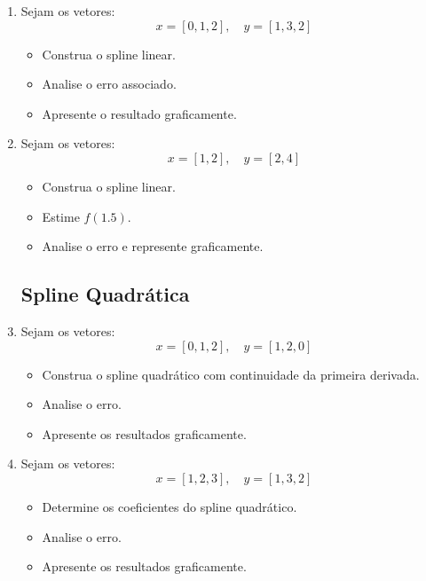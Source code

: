 \begin{enumerate}
\subsection{Spline Linear}

\item Sejam os vetores:
\[
x = [0, 1, 2], \quad y = [1, 3, 2]
\]

\begin{itemize}
    \item Construa o spline linear.
    \item Analise o erro associado.
    \item Apresente o resultado graficamente.
\end{itemize}

\item Sejam os vetores:
\[
x = [1, 2], \quad y = [2, 4]
\]

\begin{itemize}
    \item Construa o spline linear.
    \item Estime $f(1.5)$.
    \item Analise o erro e represente graficamente.
\end{itemize}

\subsection{Spline Quadrática}

\item Sejam os vetores:
\[
x = [0, 1, 2], \quad y = [1, 2, 0]
\]

\begin{itemize}
    \item Construa o spline quadrático com continuidade da primeira derivada.
    \item Analise o erro.
    \item Apresente os resultados graficamente.
\end{itemize}

\item Sejam os vetores:
\[
x = [1, 2, 3], \quad y = [1, 3, 2]
\]

\begin{itemize}
    \item Determine os coeficientes do spline quadrático.
    \item Analise o erro.
    \item Apresente os resultados graficamente.
\end{itemize}


\end{enumerate}
